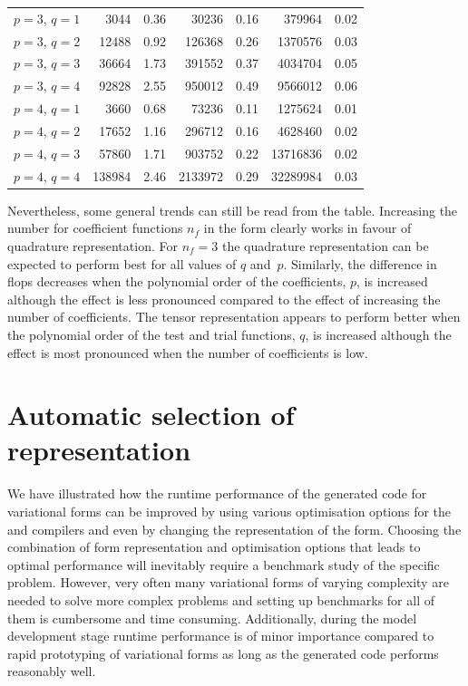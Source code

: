 \begin{table}
\begin{center}
\begin{tabular}{l|rr|rr|rr}
\hline
$p = 3$, $q = 1$  &   3044  &  0.36               &   30236 &  0.16               &  379964 & 0.02\\
$p = 3$, $q = 2$  &  12488  &  0.92               &  126368 &  0.26               & 1370576 & 0.03\\
$p = 3$, $q = 3$  &  36664  &  1.73               &  391552 &  0.37               & 4034704 & 0.05\\
$p = 3$, $q = 4$  &  92828  &  2.55               &  950012 &  0.49               & 9566012 & 0.06\\
\hline
$p = 4$, $q = 1$  &   3660  &  0.68               &   73236 &  0.11               & 1275624 & 0.01\\
$p = 4$, $q = 2$  &  17652  &  1.16               &  296712 &  0.16               & 4628460 & 0.02\\
$p = 4$, $q = 3$  &  57860  &  1.71               &  903752 &  0.22               &13716836 & 0.02\\
$p = 4$, $q = 4$  & 138984  &  2.46               & 2133972 &  0.29               &32289984 & 0.03
\end{tabular}
\end{center}
\end{table}
%
Nevertheless, some general trends can still be read from the table.
Increasing the number for coefficient functions $n_f$ in the form clearly
works in favour of quadrature representation.
For $n_{f}=3$ the quadrature representation can be expected to perform best for
all values of $q$ and~$p$.
Similarly, the difference in flops decreases when the polynomial order of the
coefficients, $p$, is increased although the effect is less pronounced compared
to the effect of increasing the number of coefficients.
The tensor representation appears to perform better when the polynomial order
of the test and trial functions, $q$, is increased although the effect is most
pronounced when the number of coefficients is low.
%
\section{Automatic selection of representation}
%
We have illustrated how the runtime performance of the
generated code for variational forms can be improved by using various
optimisation options for the \ffc{} and  compilers and even by
changing the representation of the form.
Choosing the combination of form representation and optimisation options that
leads to optimal performance will inevitably require a benchmark study of the
specific problem.
However, very often many variational forms of varying complexity are needed to
solve more complex problems and setting up benchmarks for all of them is
cumbersome and time consuming.
Additionally, during the model development stage runtime performance is of
minor importance compared to rapid prototyping of variational forms as long as
the generated code performs reasonably well.

